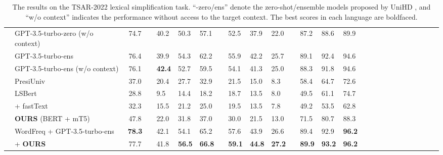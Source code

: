 \documentclass[11pt]{article}
\begin{document}
\begin{table*}[t!]
\begin{center}
\begin{adjustbox}{max width=\textwidth}
\begin{tabular}{llclllllllllllllllllllllll}
& GPT-3.5-turbo-zero (w/o context)
&74.7&&40.2&50.3&57.1&&52.5&37.9&22.0&&87.2&88.6&89.9\\


& GPT-3.5-turbo-ens
&76.4&&39.9&54.3&62.2&&55.9&42.2&25.7&&89.1&92.4&94.6
\\
& GPT-3.5-turbo-ens (w/o context)
&76.1&&\textbf{42.4}&52.7&59.5&&54.1&41.3&25.0&&88.3&91.8&94.6
\\

&PresiUniv 
&37.0&&20.4&27.7&32.9&&21.5&15.0&8.3&&58.4&64.7&72.6\\
&LSBert 
&28.8&&9.5&14.4&18.2&&18.7&13.5&8.0&&49.5&61.1&74.7
\\
&\citet{wada-etal-2022-unsupervised} + fastText
&32.3&&15.5&21.2&25.0&&19.5&13.5&7.8&&49.2&53.5&62.8\\


&\textbf{OURS} (BERT + mT5)
&47.8&&22.0&31.8&37.0&&30.0&21.5&13.0&&71.5&80.7&88.3

\\\midrule
&WordFreq + GPT-3.5-turbo-ens
&\textbf{78.3}&&42.1&54.1&65.2&&57.6&43.9&26.6&&89.4&92.9&\textbf{96.2}\\

&+ \textbf{OURS}
&77.7&&41.8&\textbf{56.5}&\textbf{66.8}&&\textbf{59.1}&\textbf{44.8}&\textbf{27.2}&&\textbf{89.9}&\textbf{93.2}&\textbf{96.2}\\




\bottomrule
\end{tabular}
\end{adjustbox}
\end{center}
\caption{The results on the TSAR-2022 lexical simplification task. ``-zero/ens'' denote the zero-shot/ensemble models proposed by UniHD \cite{aumiller-gertz-2022-unihd}, and ``w/o context'' indicates the performance without access to the target context. The best scores in each language are boldfaced.}
\label{result_tsar_all}
\end{table*}
\end{document}
